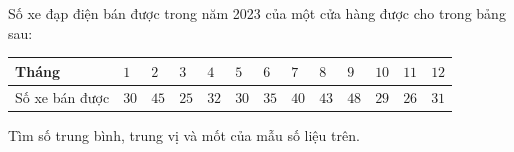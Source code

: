 \begin{bt}[H]%
Số xe đạp điện bán được trong năm 2023 của một cửa hàng được cho trong bảng sau:
	\begin{center}
		\begin{tabular}{|l|l|l|l|l|l|l|l|l|l|l|l|l|}
			\hline Tháng & $1$ & $2$ & $3$ & $4$ & $5$ & $6$ & $7$ & $8$ & $9$ & $10$ & $11$ & $12$ \\
			\hline Số xe bán được & $30$ & $45$ & $25$ & $32$ & $30$ & $35$ & $40$ & $43$ & $48$ & $29$ & $26$ & $31$ \\
			\hline
		\end{tabular}
	\end{center}
	Tìm số trung bình, trung vị và mốt của mẫu số liệu trên.
\end{bt}

